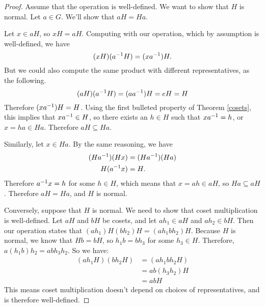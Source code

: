 \begin{proof}
Assume that the operation is well-defined. We want to show that $H$ is normal. Let $a \in G$. We'll show that $aH = Ha$.

Let $x \in aH$, so $xH = aH$. Computing with our operation, which by assumption is well-defined, we have
\begin{equation*}
    (xH)(a^{-1} H) = (xa^{-1})H.
\end{equation*}
But we could also compute the same product with different representatives, as the following.
\begin{equation*}
    (aH)(a^{-1} H) = (a a^{-1})H = eH = H
\end{equation*}
Therefore $(xa^{-1})H = H$. Using the first bulleted property of Theorem \ref{cosets}, this implies that $xa^{-1} \in H$, so there exists an $h \in H$ such that $xa^{-1} = h$, or $x = ha \in Ha$. Therefore $aH \subseteq Ha$.

Similarly, let $x \in Ha$. By the same reasoning, we have
\begin{align*}
    (Ha^{-1})(Hx) &= (Ha^{-1})(Ha) \\
    H(a^{-1} x) &= H.
\end{align*}
Therefore $a^{-1} x = h$ for some $h \in H$, which means that $x = ah \in aH$, so $Ha \subseteq aH$. Therefore $aH = Ha$, and $H$ is normal.

Conversely, suppose that $H$ is normal. We need to show that coset multiplication is well-defined. Let $aH$ and $bH$ be cosets, and let $ah_1 \in aH$ and $ah_2 \in bH$. Then our operation states that $(ah_1)H(bh_2)H = (ah_1bh_2)H$. Because $H$ is normal, we know that $Hb = bH$, so $h_1 b = b h_3$ for some $h_3 \in H$. Therefore, $a\left(h_1b\right) h_2 = ab h_3 h_2$. So we have:
\begin{align*}
    \left(ah_1 H\right)\left(bh_2 H\right) &= \left(ah_1bh_2 H\right) \\
    &= ab\left(h_3 h_2\right)H \\
    &= ab H
\end{align*}
This means coset multiplication doesn't depend on choices of representatives, and is therefore well-defined.

\end{proof}

